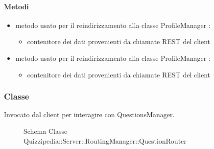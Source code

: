 \paragraph{Metodi}
\begin{itemize}
\item {}
\newline
metodo usato per il reindirizzamento alla classe ProfileManager
\newline
{} :
\begin{itemize}
\item {}
\newline
contenitore dei dati provenienti da chiamate REST del client
\end{itemize}
\item {}
\newline
metodo usato per il reindirizzamento alla classe ProfileManager
\newline
{} :
\begin{itemize}
\item {}
\newline
contenitore dei dati provenienti da chiamate REST del client
\end{itemize}
\end{itemize}
\subsubsection{Classe }
Invocato dal client per interagire con QuestionsManager.
\begin{figure}[H]
\centering
\noindent{}
\caption[Schema Classe QuestionRouter]{Schema Classe Quizzipedia::Server::RoutingManager::QuestionRouter}
\end{figure}
